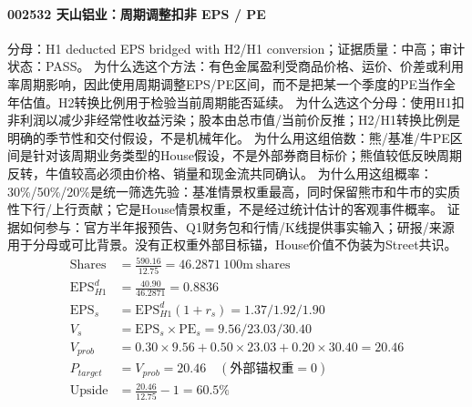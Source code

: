 \paragraph{002532 天山铝业：周期调整扣非 EPS / PE}
分母：H1 deducted EPS bridged with H2/H1 conversion；证据质量：中高；审计状态：PASS。
为什么选这个方法：有色金属盈利受商品价格、运价、价差或利用率周期影响，因此使用周期调整EPS/PE区间，而不是把某一个季度的PE当作全年估值。H2转换比例用于检验当前周期能否延续。
为什么选这个分母：使用H1扣非利润以减少非经常性收益污染；股本由总市值/当前价反推；H2/H1转换比例是明确的季节性和交付假设，不是机械年化。
为什么用这组倍数：熊/基准/牛PE区间是针对该周期业务类型的House假设，不是外部券商目标价；熊值较低反映周期反转，牛值较高必须由价格、销量和现金流共同确认。
为什么用这组概率：30\%/50\%/20\%是统一筛选先验：基准情景权重最高，同时保留熊市和牛市的实质性下行/上行贡献；它是House情景权重，不是经过统计估计的客观事件概率。
证据如何参与：官方半年报预告、Q1财务包和行情/K线提供事实输入；研报/来源用于分母或可比背景。没有正权重外部目标锚，House价值不伪装为Street共识。
\begin{align*}
\mathrm{Shares} &= \frac{590.16}{12.75}=46.2871\ \mathrm{100m\ shares}\\
\mathrm{EPS}_{H1}^d &= \frac{40.90}{46.2871}=0.8836\\
\mathrm{EPS}_s &= \mathrm{EPS}_{H1}^d(1+r_s)=1.37/1.92/1.90\\
V_s &= \mathrm{EPS}_s\times \mathrm{PE}_s=9.56/23.03/30.40\\
V_{prob} &= 0.30\times 9.56+0.50\times 23.03+0.20\times 30.40=20.46\\
P_{target} &= V_{prob}=20.46\quad(\text{外部锚权重}=0)\\
\mathrm{Upside} &= \frac{20.46}{12.75}-1=60.5\%\\
\end{align*}

